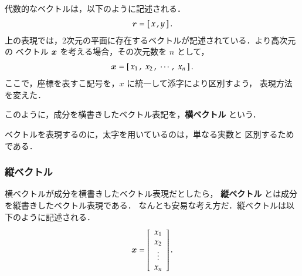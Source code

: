                 代数的なベクトルは，以下のように記述される．
                    \begin{align}
                        \boldsymbol{r} = \left[\,x\,,y\,\right].
                    \end{align}
                上の表現では，2次元の平面に存在するベクトルが記述されている．より高次元の
                ベクトル $\boldsymbol{x}$ を考える場合，その次元数を $n$ として，
                    \begin{align}
                        \boldsymbol{x} = \left[\,x_{1}\,,\,\,x_{2}\,,\,\,\cdots\,,\,\,x_{n}\,\right].
                    \end{align}
                ここで，座標を表すこ記号を，$x$ に統一して添字により区別すよう，
                表現方法を変えた．

                このように，成分を横書きしたベクトル表記を，\textbf{横ベクトル} という．

                ベクトルを表現するのに，太字を用いているのは，単なる実数と
                区別するためである．

                \subsubsection{縦ベクトル}
                    横ベクトルが成分を横書きしたベクトル表現だとしたら，
                    \textbf{縦ベクトル} とは成分を縦書きしたベクトル表現である．
                    なんとも安易な考え方だ．縦ベクトルは以下のように記述される．
                    \begin{align}
                        \boldsymbol{x}
                        =
                        \left[
                            \begin{array}{c}
                                x_{1} \\
                                x_{2} \\
                                \vdots \\
                                x_{n} \\
                            \end{array}
                        \right].
                    \end{align}

